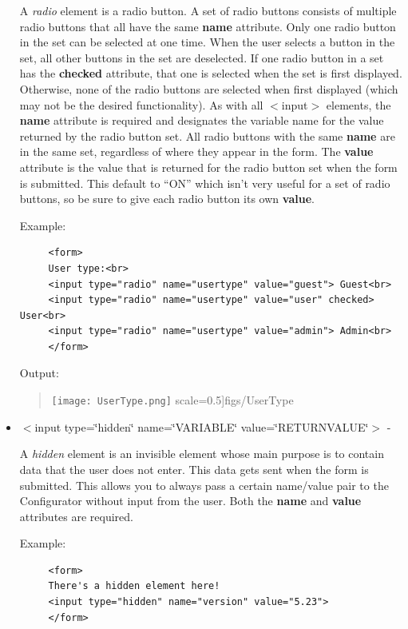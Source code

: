 \begin{itemize}
A \textit{radio} element is a radio button. A set of radio buttons
consists of multiple radio buttons that all have the same \textbf{name}
attribute. Only one radio button in the set can be selected at one
time. When the user selects a button in the set, all other buttons
in the set are deselected. If one radio button in a set has the \textbf{checked}
attribute, that one is selected when the set is first displayed. Otherwise,
none of the radio buttons are selected when first displayed (which
may not be the desired functionality). As with all $<$input$>$ elements,
the \textbf{name} attribute is required and designates the variable
name for the value returned by the radio button set. All radio buttons
with the same \textbf{name} are in the same set, regardless of where
they appear in the form. The \textbf{value} attribute is the value
that is returned for the radio button set when the form is submitted.
This default to {}``ON'' which isn't very useful for a set of radio
buttons, so be sure to give each radio button its own \textbf{value}.

Example:

\begin{footnotesize}
\begin{verbatim}
     <form> 
     User type:<br> 
     <input type="radio" name="usertype" value="guest"> Guest<br> 
     <input type="radio" name="usertype" value="user" checked> User<br> 
     <input type="radio" name="usertype" value="admin"> Admin<br> 
     </form>
\end{verbatim}
\end{footnotesize}

Output: 

\begin{quote}
\texttt{[image: UserType.png]}
  scale=0.5]{figs/UserType}
\end{quote}
\item $<$input type=\char`\"{}hidden\char`\"{} name=\char`\"{}VARIABLE\char`\"{}
value=\char`\"{}RETURNVALUE\char`\"{}$>$ - 


A \textit{hidden} element is an invisible element whose main purpose
is to contain data that the user does not enter. This data gets sent
when the form is submitted. This allows you to always pass a certain
name/value pair to the Configurator without input from the user. Both
the \textbf{name} and \textbf{value} attributes are required.

Example:

\begin{footnotesize}
\begin{verbatim}
     <form> 
     There's a hidden element here!
     <input type="hidden" name="version" value="5.23"> 
     </form>
\end{verbatim}
\end{footnotesize}


\end{itemize}
